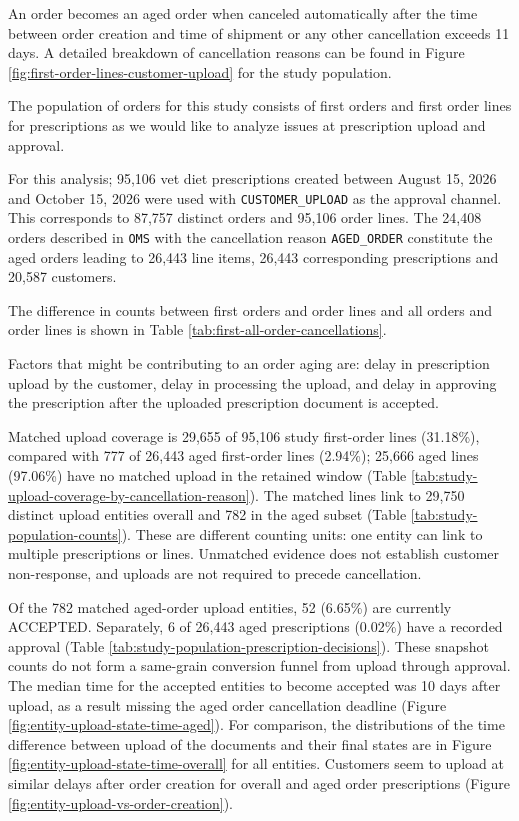 \label{app:aged-order-analysis}
An order becomes an aged order when canceled automatically after the
time between order creation and time of shipment or any other
cancellation exceeds 11 days. A detailed breakdown of cancellation
reasons can be found in Figure \ref{fig:first-order-lines-customer-upload}
for the study population.

The population of orders for this study consists of first orders and
first order lines for prescriptions as we would like to analyze issues at
prescription upload and approval.

For this analysis; 95,106 vet diet prescriptions created between
August 15, 2026 and October 15, 2026 were used with
\verb|CUSTOMER_UPLOAD| as the approval channel. This corresponds to
87,757 distinct orders and 95,106 order lines. The 24,408 orders
described in \verb|OMS| with the cancellation reason
\verb|AGED_ORDER| constitute the  aged orders leading to 26,443 line
items, 26,443 corresponding prescriptions and 20,587 customers.

The difference in counts between first orders and order lines and all
orders and order lines is shown in Table
\ref{tab:first-all-order-cancellations}.


Factors that might be contributing to an order aging are: delay in
prescription upload by the customer, delay in processing the upload,
and delay in approving the prescription after the uploaded
prescription document is accepted.

Matched upload coverage is 29,655 of 95,106 study first-order lines
(31.18\%), compared with 777 of 26,443 aged first-order lines (2.94\%);
25,666 aged lines (97.06\%) have no matched upload in the retained window
(Table \ref{tab:study-upload-coverage-by-cancellation-reason}).
The matched lines link to 29,750 distinct upload entities overall and
782 in the aged subset (Table \ref{tab:study-population-counts}).
These are different counting units: one entity can link to multiple
prescriptions or lines. Unmatched evidence does not establish customer
non-response, and uploads are not required to precede cancellation.

Of the 782 matched aged-order upload entities, 52 (6.65\%) are currently
ACCEPTED. Separately, 6 of 26,443 aged prescriptions (0.02\%) have a
recorded approval (Table \ref{tab:study-population-prescription-decisions}).
These snapshot counts do not form a same-grain conversion funnel from
upload through approval. The median time for the accepted entities
to become accepted was 10 days after upload, as a result
missing the aged order cancellation deadline (Figure
\ref{fig:entity-upload-state-time-aged}).  For comparison, the
distributions of the time difference between upload of the documents
and their final states are in Figure
\ref{fig:entity-upload-state-time-overall} for all entities.
Customers seem to upload at similar delays after order creation for
overall and aged order prescriptions (Figure
\ref{fig:entity-upload-vs-order-creation}).

